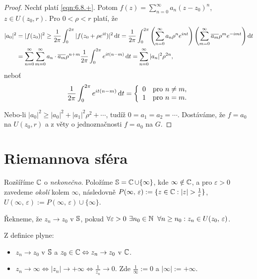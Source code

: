 \begin{proof}
Nechť platí \cref{eqn:6.8.+}. Potom $f(z)=\sum\limits_{n=0}^\infty a_n(z-z_0)^{n}$, $z\in U(z_0,r)$. Pro $0<\rho<r$ platí, že 
\begin{equation}
    \begin{aligned}
    |a_0|^2 &=
    |f(z_0)|^2 \geq 
    \frac{1}{2 \pi} \int_{0}^{2 \pi} |f(z_0+\rho e^{it})|^2 \mathop{}\!\mathrm{d} t =
    \frac{1}{2\pi} \int_{0}^{2 \pi} \left(\sum\limits_{n=0}^\infty a_n \rho^n e^{int}\right)\left(\sum\limits_{m=0}^\infty \overline{a_m} \rho^m e^{-imt}\right) \mathop{}\!\mathrm{d} t  \\
    & = \sum\limits_{n=0}^\infty \sum\limits_{m=0}^\infty a_n\cdot \overline{a_m} \rho^{n+m} \frac{1}{2 \pi} \int_{0}^{2 \pi}  e^{it(n-m)} \mathop{}\!\mathrm{d} t=\sum\limits_{n=0}^\infty |a_n|^2\rho^{2n},
    \end{aligned}
\end{equation}
 neboť
 $$\frac{1}{2 \pi} \int_{0}^{2 \pi}  e^{it(n-m)} \mathop{}\!\mathrm{d} t = \left\{ \begin{array}{ll} 0 & \mbox{pro } n \neq m, \\ 1 & \mbox{pro } n = m. \end{array} \right.$$ 

Nebo-li $|a_0|^2\geq|a_0|^2+|a_1|^2\rho^2+\cdots$, tudíž $0=a_1=a_2=\cdots$. Dostáváme, že $f=a_0$ na $U(z_0,r)$ a z věty o jednoznačnosti $f=a_0$ na $G$.
\end{proof}

\section{\texorpdfstring{Riemannova sféra}{Riemannova sféra}}
Rozšíříme $\operatorname{\mathbb{C}}  $ o \emph{nekonečno}.
Položíme $\operatorname{\mathbb{S}}=\operatorname{\mathbb{C}}  \cup\{\infty\}$, kde $\infty\notin\operatorname{\mathbb{C}}  $, a pro $\varepsilon>0$ zavedeme \emph{okolí} kolem $\infty$, následovně $P(\infty,\,\varepsilon):=\{z\in\Comp  : |z|>\frac{1}{\varepsilon}\}$,
$U(\infty,\,\varepsilon):=P(\infty,\,\varepsilon)\cup \{\infty\}$.

\begin{definition}
Řekneme, že $z_n\rightarrow z_0$ v $\operatorname{\mathbb{S}}$, pokud $\forall\varepsilon>0\textbf{ }  \exists n_0\in\operatorname{\mathbb{N}}\textbf{ }\forall n\geq n_0:z_n\in U(z_0,\,\varepsilon)$.
\end{definition}

\begin{note} Z definice plyne:
\begin{itemize}
    \item $z_n\rightarrow z_0$ v $\operatorname{\mathbb{S}}$ a $z_0\in\operatorname{\mathbb{C}}  \Leftrightarrow z_n\rightarrow z_0$ v $\operatorname{\mathbb{C}}  $.
    \item $z_n\rightarrow\infty\Leftrightarrow|z_n|\rightarrow+\infty\Leftrightarrow\frac{1}{z_n}\rightarrow 0$. Zde $\frac{1}{\infty}:=0$ a $|\infty|:=+\infty$.
\end{itemize}
\end{note}

